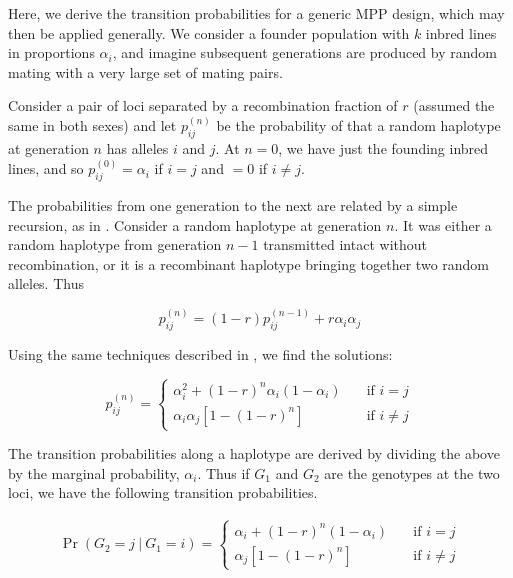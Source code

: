 \documentclass[12pt,letterpaper]{article}\usepackage[]{graphicx}\usepackage[table]{xcolor}
\begin{document}
Here, we derive the transition probabilities for a generic MPP design,
which may then be applied generally. We consider a founder population
with $k$ inbred lines in proportions $\alpha_i$, and imagine
subsequent generations are produced by random mating with a very large
set of mating pairs.

Consider a pair of loci separated by a recombination fraction of $r$
(assumed the same in both sexes) and let $p_{ij}^{(n)}$ be the
probability of that a random haplotype at generation $n$
has alleles $i$ and $j$.
At $n=0$, we have just the founding inbred lines, and so
$p_{ij}^{(0)} = \alpha_i$ if $i=j$ and $=0$ if $i
\ne j$.

The probabilities from one generation to the next are related by a
simple recursion, as in \citet{broman2012b}. Consider a random haplotype
at generation $n$. It was either a random haplotype from generation
$n-1$ transmitted intact without recombination, or it is a recombinant
haplotype bringing together two random alleles. Thus

\begin{equation}
p_{ij}^{(n)} = (1-r)p_{ij}^{(n-1)} + r \alpha_i \alpha_j
\end{equation}

Using the same techniques described in \citet{broman2012b}, we find
the solutions:

\begin{equation}
  p_{ij}^{(n)} =
\left\{ \begin{array}{ll}
\alpha_i^2 + (1-r)^n \alpha_i (1-\alpha_i) & \quad \text{if } i = j \\
\alpha_i \alpha_j [1 - (1-r)^n]            & \quad \text{if } i \ne j
\end{array}
\right.
\label{eqn:p_ij}
\end{equation}

The transition probabilities along a haplotype are derived by dividing
the above by the marginal probability, $\alpha_i$. Thus if $G_1$ and
$G_2$ are the genotypes at the two loci, we have the following
transition probabilities.

\begin{eqnarray}
\Pr(G_2=j \ | \ G_1=i) =
\left\{ \begin{array}{ll}
\alpha_i + (1-r)^n (1 - \alpha_i) & \quad \text{if } i = j \\
\alpha_j [1 - (1-r)^n]            & \quad \text{if } i \ne j
\end{array}
\right.
\end{eqnarray}
\end{document}
